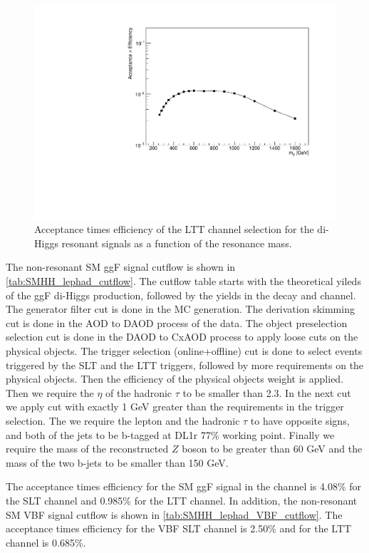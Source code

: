 \begin{figure}
\centering
\includegraphics[width=.65\textwidth]{figures/selection/LepHad_HH/LTT_AccEff.pdf}
\caption{Acceptance times efficiency of the \lephad LTT channel selection for the di-Higgs resonant signals as a function of the resonance mass.}
\label{fig:LepHadAccEffLTT}
\end{figure}



The non-resonant \lephad SM ggF signal cutflow is shown in \cref{tab:SMHH_lephad_cutflow}. 
The cutflow table starts with the theoretical yileds of the ggF di-Higgs production, followed by 
the yields in the \bbtt decay and \lephad channel. 
The generator filter cut is done in the MC generation.
The derivation skimming cut is done in the AOD to DAOD process of the data. 
The object preselection selection cut is done in the DAOD to CxAOD process to 
apply loose cuts on the physical objects. 
The trigger selection (online+offline) cut is done to select events triggered by the SLT and the
LTT triggers, followed by more requirements on the physical objects. 
Then the efficiency of the physical objects weight is applied. 
Then we require the $\eta$ of the hadronic $\tau$ to be smaller than 2.3. 
In the next cut we apply \pt cut with exactly 1 GeV greater than the \pt requirements
in the trigger selection. 
The we require the lepton and the hadronic $\tau$ to have opposite signs, and both of the
jets to be b-tagged at DL1r 77\% working point. Finally we require the mass of the 
reconstructed $Z$ boson to be greater than 60 GeV and the mass of the two b-jets to be
smaller than 150 GeV.


The acceptance times efficiency for the SM ggF signal in the \lephad channel is 4.08\% for the SLT channel and 0.985\% for the LTT channel.
In addition, the non-resonant \lephad SM VBF signal cutflow is shown in \cref{tab:SMHH_lephad_VBF_cutflow}. The acceptance times efficiency for the VBF SLT channel is 2.50\% and for the LTT channel is 0.685\%. 

